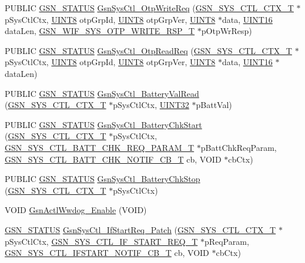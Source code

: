 \begin{DoxyCompactItemize}
\item 
PUBLIC \hyperlink{a00660_gada5951904ac6110b1fa95e51a9ddc217}{GSN\_\-STATUS} \hyperlink{a00592_a75f75c40a9296f2dacfe366b7a64f8f2}{GsnSysCtl\_\-OtpWriteReq} (\hyperlink{a00248}{GSN\_\-SYS\_\-CTL\_\-CTX\_\-T} $\ast$pSysCtlCtx, \hyperlink{a00660_gab27e9918b538ce9d8ca692479b375b6a}{UINT8} otpGrpId, \hyperlink{a00660_gab27e9918b538ce9d8ca692479b375b6a}{UINT8} otpGrpVer, \hyperlink{a00660_gab27e9918b538ce9d8ca692479b375b6a}{UINT8} $\ast$data, \hyperlink{a00660_ga09f1a1fb2293e33483cc8d44aefb1eb1}{UINT16} dataLen, \hyperlink{a00361}{GSN\_\-WIF\_\-SYS\_\-OTP\_\-WRITE\_\-RSP\_\-T} $\ast$pOtpWrResp)
\item 
PUBLIC \hyperlink{a00660_gada5951904ac6110b1fa95e51a9ddc217}{GSN\_\-STATUS} \hyperlink{a00592_ab26b5b1dc2ef02592b923aa2b98b45f0}{GsnSysCtl\_\-OtpReadReq} (\hyperlink{a00248}{GSN\_\-SYS\_\-CTL\_\-CTX\_\-T} $\ast$pSysCtlCtx, \hyperlink{a00660_gab27e9918b538ce9d8ca692479b375b6a}{UINT8} otpGrpId, \hyperlink{a00660_gab27e9918b538ce9d8ca692479b375b6a}{UINT8} otpGrpVer, \hyperlink{a00660_gab27e9918b538ce9d8ca692479b375b6a}{UINT8} $\ast$data, \hyperlink{a00660_ga09f1a1fb2293e33483cc8d44aefb1eb1}{UINT16} $\ast$dataLen)
\item 
PUBLIC \hyperlink{a00660_gada5951904ac6110b1fa95e51a9ddc217}{GSN\_\-STATUS} \hyperlink{a00592_a07648b2ae939209215eded8c1213aa1d}{GsnSysCtl\_\-BatteryValRead} (\hyperlink{a00248}{GSN\_\-SYS\_\-CTL\_\-CTX\_\-T} $\ast$pSysCtlCtx, \hyperlink{a00660_gae1e6edbbc26d6fbc71a90190d0266018}{UINT32} $\ast$pBattVal)
\item 
PUBLIC \hyperlink{a00660_gada5951904ac6110b1fa95e51a9ddc217}{GSN\_\-STATUS} \hyperlink{a00592_a9f2c6bcfbcc85953c3c8326b23f24fb7}{GsnSysCtl\_\-BatteryChkStart} (\hyperlink{a00248}{GSN\_\-SYS\_\-CTL\_\-CTX\_\-T} $\ast$pSysCtlCtx, \hyperlink{a00346}{GSN\_\-SYS\_\-CTL\_\-BATT\_\-CHK\_\-REQ\_\-PARAM\_\-T} $\ast$pBattChkReqParam, \hyperlink{a00592_af97ab705a1dd2c6de5dfc45aab9d47fe}{GSN\_\-SYS\_\-CTL\_\-BATT\_\-CHK\_\-NOTIF\_\-CB\_\-T} cb, VOID $\ast$cbCtx)
\item 
PUBLIC \hyperlink{a00660_gada5951904ac6110b1fa95e51a9ddc217}{GSN\_\-STATUS} \hyperlink{a00592_a91bc1586b57fdd91df9da882885045de}{GsnSysCtl\_\-BatteryChkStop} (\hyperlink{a00248}{GSN\_\-SYS\_\-CTL\_\-CTX\_\-T} $\ast$pSysCtlCtx)
\item 
VOID \hyperlink{a00592_a668061db07a2f8da5ea03f9229f65c38}{GsnActlWwdog\_\-Enable} (VOID)
\item 
\hyperlink{a00660_gada5951904ac6110b1fa95e51a9ddc217}{GSN\_\-STATUS} \hyperlink{a00592_ab151ccb83053613a4368acc6671f37e1}{GsnSysCtl\_\-IfStartReq\_\-Patch} (\hyperlink{a00248}{GSN\_\-SYS\_\-CTL\_\-CTX\_\-T} $\ast$pSysCtlCtx, \hyperlink{a00353}{GSN\_\-SYS\_\-CTL\_\-IF\_\-START\_\-REQ\_\-T} $\ast$pReqParam, \hyperlink{a00592_a2378a15a57410fa717b24a73398855f4}{GSN\_\-SYS\_\-CTL\_\-IFSTART\_\-NOTIF\_\-CB\_\-T} cb, VOID $\ast$cbCtx)

\end{DoxyCompactItemize}
